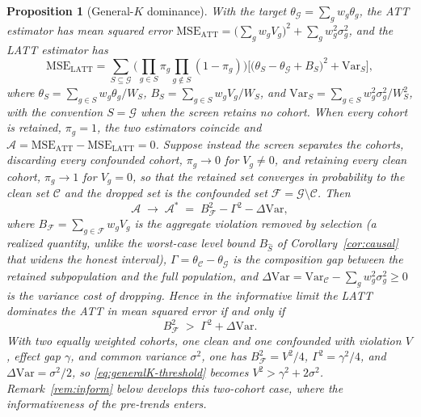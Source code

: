 \documentclass[12pt]{article}
\newtheorem{proposition}{Proposition}
\theoremstyle{remark}
\begin{document}
\begin{proposition}[General-$K$ dominance]\label{prop:generalK}
With the target $\theta_{\mathcal G}=\sum_g w_g\theta_g$, the ATT estimator has mean squared
error $\mathrm{MSE}_{\mathrm{ATT}}=\big(\sum_g w_gV_g\big)^2+\sum_g w_g^2\sigma_g^2$, and the
LATT estimator has
\begin{equation}\label{eq:latt-exact}
\mathrm{MSE}_{\mathrm{LATT}}=\sum_{S\subseteq\mathcal G}
\Big(\textstyle\prod_{g\in S}\pi_g\prod_{g\notin S}(1-\pi_g)\Big)
\Big[\big(\theta_S-\theta_{\mathcal G}+B_S\big)^2+\mathrm{Var}_S\Big],
\end{equation}
where $\theta_S=\sum_{g\in S}w_g\theta_g/W_S$, $B_S=\sum_{g\in S}w_gV_g/W_S$, and
$\mathrm{Var}_S=\sum_{g\in S}w_g^2\sigma_g^2/W_S^2$, with the convention $S=\mathcal G$ when the
screen retains no cohort. When every cohort is retained, $\pi_g=1$, the two estimators
coincide and $\mathcal{A}=\mathrm{MSE}_{\mathrm{ATT}}-\mathrm{MSE}_{\mathrm{LATT}}=0$. Suppose instead
the screen separates the cohorts, discarding every confounded cohort, $\pi_g\to0$ for
$V_g\neq0$, and retaining every clean cohort, $\pi_g\to1$ for $V_g=0$, so that the retained
set converges in probability to the clean set $\mathcal C$ and the dropped set is the
confounded set $\mathcal F=\mathcal G\setminus\mathcal C$. Then
\begin{equation}\label{eq:deltastar}
\mathcal{A}\;\longrightarrow\;\mathcal{A}^\ast\;=\;B_{\mathcal F}^2-\Gamma^2-\Delta\mathrm{Var},
\end{equation}
where $B_{\mathcal F}=\sum_{g\in\mathcal F}w_gV_g$ is the aggregate violation removed by
selection (a realized quantity, unlike the worst-case level bound $B_{\hat S}$ of
Corollary~\ref{cor:causal} that widens the honest interval), $\Gamma=\theta_{\mathcal C}-\theta_{\mathcal G}$
is the composition gap between the
retained subpopulation and the full population, and
$\Delta\mathrm{Var}=\mathrm{Var}_{\mathcal C}-\sum_g w_g^2\sigma_g^2\ge0$ is the variance cost of
dropping. Hence in the informative limit the LATT dominates the ATT in mean squared error if
and only if
\begin{equation}\label{eq:generalK-threshold}
B_{\mathcal F}^2\;>\;\Gamma^2+\Delta\mathrm{Var}.
\end{equation}
With two equally weighted cohorts, one clean and one confounded with violation $V$, effect gap
$\gamma$, and common variance $\sigma^2$, one has $B_{\mathcal F}^2=V^2/4$, $\Gamma^2=\gamma^2/4$,
and $\Delta\mathrm{Var}=\sigma^2/2$, so \eqref{eq:generalK-threshold} becomes $V^2>\gamma^2+2\sigma^2$.
Remark~\ref{rem:inform} below develops this two-cohort case, where the informativeness of the
pre-trends enters.
\end{proposition}
\end{document}
